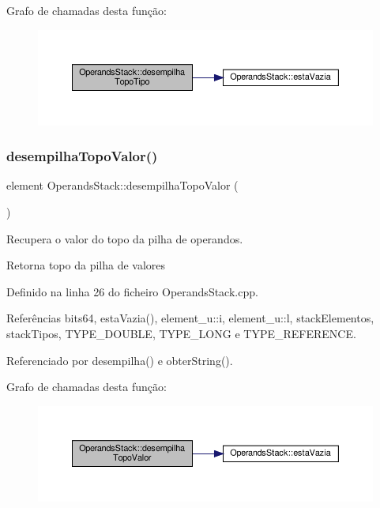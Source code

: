 Grafo de chamadas desta função\+:\nopagebreak
\begin{figure}[H]
\begin{center}
\leavevmode
\includegraphics[width=350pt]{classOperandsStack_a8c76f12ad6984b3c5b4ec8807eb63ae3_cgraph}
\end{center}
\end{figure}
\mbox{\label{classOperandsStack_a184a99d160e17ef874a7b83f0726fb8a}} 
\subsubsection{\texorpdfstring{desempilha\+Topo\+Valor()}{desempilhaTopoValor()}}
{\footnotesize\ttfamily element Operands\+Stack\+::desempilha\+Topo\+Valor (\begin{DoxyParamCaption}{ }\end{DoxyParamCaption})}



Recupera o valor do topo da pilha de operandos. 

Retorna topo da pilha de valores 

Definido na linha 26 do ficheiro Operands\+Stack.\+cpp.



Referências bits64, esta\+Vazia(), element\+\_\+u\+::i, element\+\_\+u\+::l, stack\+Elementos, stack\+Tipos, T\+Y\+P\+E\+\_\+\+D\+O\+U\+B\+LE, T\+Y\+P\+E\+\_\+\+L\+O\+NG e T\+Y\+P\+E\+\_\+\+R\+E\+F\+E\+R\+E\+N\+CE.



Referenciado por desempilha() e obter\+String().

Grafo de chamadas desta função\+:\nopagebreak
\begin{figure}[H]
\begin{center}
\leavevmode
\includegraphics[width=350pt]{classOperandsStack_a184a99d160e17ef874a7b83f0726fb8a_cgraph}
\end{center}
\end{figure}
\mbox{\label{classOperandsStack_a9503313a7def4c11fb782d5881e3d6cb}} 
